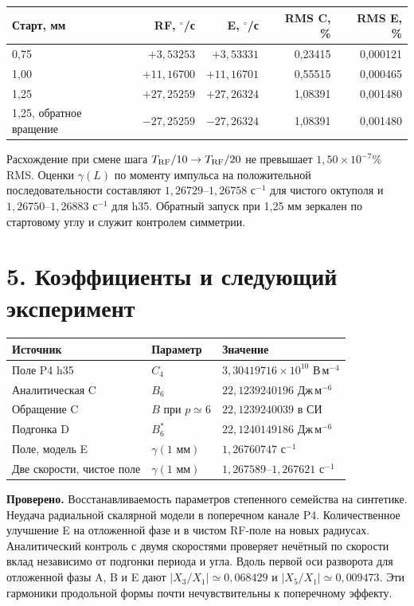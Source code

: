 \documentclass[11pt,a4paper]{article}
\newcommand{\e}[1]{\times10^{#1}}
\begin{document}
\begin{center}
\small
\begin{tabular}{@{}lrrrr@{}}
\toprule
Старт, мм & RF, $^\circ$/с & E, $^\circ$/с & RMS C, \% & RMS E, \% \\
\midrule
0,75 & $+3{,}53253$ & $+3{,}53331$ & 0,23415 & 0,000121 \\
1,00 & $+11{,}16700$ & $+11{,}16701$ & 0,55515 & 0,000465 \\
1,25 & $+27{,}25259$ & $+27{,}26324$ & 1,08391 & 0,001480 \\
1,25, обратное вращение & $-27{,}25259$ & $-27{,}26324$ & 1,08391 & 0,001480 \\
\bottomrule
\end{tabular}
\end{center}
Расхождение при смене шага $T_{\rm RF}/10\to T_{\rm RF}/20$
не превышает $1{,}50\e{-7}\%$ RMS. Оценки $\gamma(L)$ по моменту
импульса на положительной последовательности составляют
$1{,}26729$--$1{,}26758$ с$^{-1}$ для чистого октуполя и
$1{,}26750$--$1{,}26883$ с$^{-1}$ для h35. Обратный запуск
при 1,25 мм зеркален по стартовому углу и служит контролем симметрии.

\newpage
\section*{5. Коэффициенты и следующий эксперимент}
\begin{center}
\begin{tabular}{@{}lll@{}}
\toprule
Источник & Параметр & Значение \\
\midrule
Поле P4 h35 & $C_4$ & $3{,}30419716\e{10}$ В\,м$^{-4}$ \\
Аналитическая C & $B_6$ & $22{,}1239240196$ Дж\,м$^{-6}$ \\
Обращение C & $B$ при $p\simeq 6$ & $22{,}1239240039$ в СИ \\
Подгонка D & $B_6^\ast$ & $22{,}1240149186$ Дж\,м$^{-6}$ \\
Поле, модель E & $\gamma(1\text{ мм})$ & $1{,}26760747$ с$^{-1}$ \\
Две скорости, чистое поле & $\gamma(1\text{ мм})$ & $1{,}267589$--$1{,}267621$ с$^{-1}$ \\
\bottomrule
\end{tabular}
\end{center}

\textbf{Проверено.} Восстанавливаемость параметров степенного семейства
на синтетике. Неудача радиальной скалярной модели в поперечном
канале P4. Количественное улучшение E на отложенной фазе и в чистом
RF-поле на новых радиусах. Аналитический контроль с двумя скоростями
проверяет нечётный по скорости вклад независимо от подгонки периода и угла.
Вдоль первой оси разворота для отложенной фазы A, B и E дают
$|X_3/X_1|\simeq0{,}068429$ и $|X_5/X_1|\simeq0{,}009473$.
Эти гармоники продольной формы почти нечувствительны к поперечному эффекту.
\end{document}
